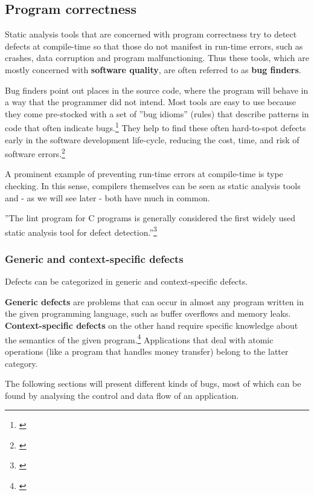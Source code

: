 \subsection{Program correctness}

Static analysis tools that are concerned with program correctness try to detect defects at compile-time so that those do not manifest in run-time errors, such as crashes, data corruption and program malfunctioning. Thus these tools, which are mostly concerned with \textbf{software quality}, are often referred to as \textbf{bug finders}.

Bug finders point out places in the source code, where the program will behave in a way that the programmer did not intend. Most tools are easy to use because they come pre-stocked with a set of ''bug idioms'' (rules) that describe patterns in code that often indicate bugs.\footnote{\citep[32]{SecureProgramming}} They help to find these often hard-to-spot defects early in the software development life-cycle, reducing the cost, time, and risk of software errors.\footnote{\citep{CovertySA}}

A prominent example of preventing run-time errors at compile-time is type checking. In this sense, compilers themselves can be seen as static analysis tools and - as we will see later - both have much in common.

''The lint program for C programs is generally considered the first widely used static analysis tool for defect detection.''\footnote{\citep[1]{UsingSAToFindBugs}}

\subsubsection{Generic and context-specific defects}

Defects can be categorized in generic and context-specific defects.

\textbf{Generic defects} are problems that can occur in almost any program written in the given programming language, such as buffer overflows and memory leaks.\\
\textbf{Context-specific defects} on the other hand require specific knowledge about the semantics of the given program.\footnote{\citep[14]{SecureProgramming}} Applications that deal with atomic operations (like a program that handles money transfer) belong to the latter category.

The following sections will present different kinds of bugs, most of which can be found by analysing the control and data flow of an application.

